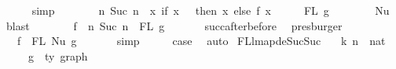 \begin{isabellebody}
\ \ \ \ \isamarkupfalse%
\ simp\isanewline
\ \ \isamarkupfalse%
\ \isamarkupfalse%
\ {\isachardoublequoteopen}{\isachardot}{\kern0pt}{\isachardot}{\kern0pt}{\isachardot}{\kern0pt}\ {\isacharequal}{\kern0pt}\ {\isacharbraceleft}{\kern0pt}n{\isachardot}{\kern0pt}\ Suc\ n\ {\isasymin}\ {\isacharparenleft}{\kern0pt}{\isasymlambda}x{\isachardot}{\kern0pt}\ if\ x\ {\isacharequal}{\kern0pt}\ {}\ then\ x\ else\ {\isacharparenleft}{\kern0pt}f\ {\isacharparenleft}{\kern0pt}x\ {\isacharminus}{\kern0pt}\ {}{\isacharparenright}{\kern0pt}\ {\isacharplus}{\kern0pt}\ {}{\isacharparenright}{\kern0pt}{\isacharparenright}{\kern0pt}\ {\isacharbackquote}{\kern0pt}\ FL\ g{\isacharbraceright}{\kern0pt}{\isachardoublequoteclose}\isanewline
\ \ \ \ \ \ \isamarkupfalse%
\ Nu\ \isamarkupfalse%
\ blast\isanewline
\ \ \isamarkupfalse%
\ \isamarkupfalse%
\ {\isachardoublequoteopen}{\isachardot}{\kern0pt}{\isachardot}{\kern0pt}{\isachardot}{\kern0pt}\ {\isacharequal}{\kern0pt}\ f\ {\isacharbackquote}{\kern0pt}\ {\isacharbraceleft}{\kern0pt}n{\isachardot}{\kern0pt}\ Suc\ n\ {\isasymin}\ FL\ g{\isacharbraceright}{\kern0pt}{\isachardoublequoteclose}\isanewline
\ \ \ \ \ \isamarkupfalse%
\ succ{\isacharunderscore}{\kern0pt}after{\isacharunderscore}{\kern0pt}before\ \isamarkupfalse%
\ presburger\isanewline
\ \ \isamarkupfalse%
\ \isamarkupfalse%
\ {\isachardoublequoteopen}{\isachardot}{\kern0pt}{\isachardot}{\kern0pt}{\isachardot}{\kern0pt}\ {\isacharequal}{\kern0pt}\ f\ {\isacharbackquote}{\kern0pt}\ FL\ {\isacharparenleft}{\kern0pt}Nu\ g{\isacharparenright}{\kern0pt}{\isachardoublequoteclose}\isanewline
\ \ \ \ \ \isamarkupfalse%
\ simp\isanewline
\ \ \isamarkupfalse%
\ \isamarkupfalse%
\ {\isacharquery}{\kern0pt}case\ \isakeywordONE{{\isachardot}{\kern0pt}}\isamarkupfalse%
\isanewline
{}\isamarkupfalse%
\ auto%
\endisatagproof
{\isafoldproof}%
%
\isadelimproof
\isanewline
%
\endisadelimproof
\isanewline
\isanewline
{}\isamarkupfalse%
\ FL{\isacharunderscore}{\kern0pt}lmap{\isacharunderscore}{\kern0pt}deSuc{\isacharunderscore}{\kern0pt}Suc{\isacharcolon}{\kern0pt}\isanewline
\ \ \ k\ n\ {\isacharcolon}{\kern0pt}{\isacharcolon}{\kern0pt}\ nat\isanewline
\ \ \ \ \ g\ {\isacharcolon}{\kern0pt}{\isacharcolon}{\kern0pt}\ {\isachardoublequoteopen}{\isacharprime}{\kern0pt}ty\ graph{\isachardoublequoteclose}\isanewline

\end{isabellebody}
